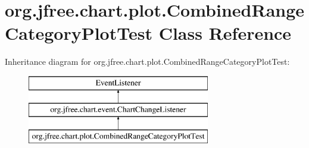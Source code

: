 \hypertarget{classorg_1_1jfree_1_1chart_1_1plot_1_1_combined_range_category_plot_test}{}\section{org.\+jfree.\+chart.\+plot.\+Combined\+Range\+Category\+Plot\+Test Class Reference}
\label{classorg_1_1jfree_1_1chart_1_1plot_1_1_combined_range_category_plot_test}
Inheritance diagram for org.\+jfree.\+chart.\+plot.\+Combined\+Range\+Category\+Plot\+Test\+:\begin{figure}[H]
\begin{center}
\leavevmode
\includegraphics[height=3.000000cm]{classorg_1_1jfree_1_1chart_1_1plot_1_1_combined_range_category_plot_test}
\end{center}
\end{figure}
